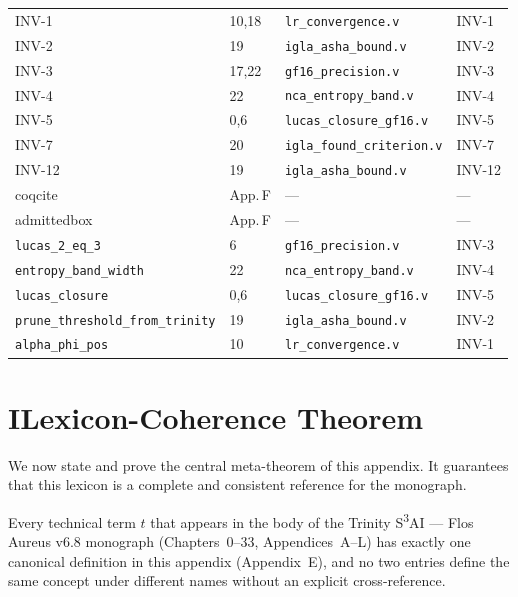 \begin{longtable}{p{3.6cm} p{2.0cm} p{3.5cm} p{1.6cm}}
INV-1 & 10,18 & \texttt{lr\_convergence.v} & INV-1 \\
INV-2 & 19 & \texttt{igla\_asha\_bound.v} & INV-2 \\
INV-3 & 17,22 & \texttt{gf16\_precision.v} & INV-3 \\
INV-4 & 22 & \texttt{nca\_entropy\_band.v} & INV-4 \\
INV-5 & 0,6 & \texttt{lucas\_closure\_gf16.v} & INV-5 \\
INV-7 & 20 & \texttt{igla\_found\_criterion.v} & INV-7 \\
INV-12 & 19 & \texttt{igla\_asha\_bound.v} & INV-12 \\
coqcite & App.\,F & --- & --- \\
admittedbox & App.\,F & --- & --- \\
\texttt{lucas\_2\_eq\_3} & 6 & \texttt{gf16\_precision.v} & INV-3 \\
\texttt{entropy\_band\_width} & 22 & \texttt{nca\_entropy\_band.v} & INV-4 \\
\texttt{lucas\_closure} & 0,6 & \texttt{lucas\_closure\_gf16.v} & INV-5 \\
\texttt{prune\_threshold\_from\_trinity} & 19 & \texttt{igla\_asha\_bound.v} & INV-2 \\
\texttt{alpha\_phi\_pos} & 10 & \texttt{lr\_convergence.v} & INV-1 \\
\end{longtable}

\bigskip

\section*{I\quad Lexicon-Coherence Theorem}
\label{sec:lexicon-coherence-theorem}

\noindent
We now state and prove the central meta-theorem of this appendix.
It guarantees that this lexicon is a complete and consistent
reference for the monograph.

\begin{theorem}\label{thm:lexicon-coherence}
Every technical term $t$ that appears in the body of the
Trinity S\textsuperscript{3}AI --- Flos Aureus v6.8 monograph
(Chapters~0--33, Appendices~A--L) has exactly one canonical
definition in this appendix (Appendix~E), and no two entries
define the same concept under different names without an explicit
cross-reference.
\end{theorem}

